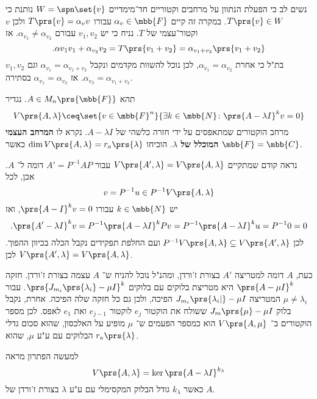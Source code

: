 \documentclass[article, 10pt,oneside]{article}
\renewcommand{\emph}[1]{\textbf{#1}}
\begin{document}
\begin{solution}
נשים לב כי הפעלת הנתוון על מרחבים וקטוריים חד־מימדיים
$W = \spn\set{v}$
נותנת כי
$T\prs{v} \in W$.
במקרה זה קיים
$\alpha_v \in \mbb{F}$
עבורו
$T\prs{v} = \alpha_v v$
ולכן
$v$
וקטור־עצמי של
$T$.
נניח כי יש
$v_1, v_2$
עבורם
$\alpha_{v_1} \neq \alpha_{v_2}$.
אז
\[\text{.} \alpha{v_1} v_1 + \alpha_{v_2} v_2 = T\prs{v_1 + v_2} = \alpha_{v_1 + v_2} \prs{v_1 + v_2}\]
$v_1,v_2$
בת"ל כי אחרת
$\alpha_{v_1} = \alpha_{v_2}$,
לכן נוכל להשוות מקדמים ונקבל
$\alpha_{v_1} = \alpha_{v_1 + v_2}$
וגם
$\alpha_{v_2} = \alpha_{v_1 + v_2}$.
אז
$\alpha_{v_1} = \alpha_{v_2}$
בסתירה.
\end{solution}

\begin{exercise}
תהא
$A \in M_n\prs{\mbb{F}}$.
נגדיר
\[V\prs{A, \lambda} \ceq \set{v \in \mbb{F}^n}{\exists k \in \mbb{N} \colon \prs{A- \lambda I}^k v = 0}\]
מרחב הוקטורים שמתאפסים על ידי חזרה כלשהי של
$A - \lambda I$.
נקרא לו
\emph{המרחב העצמי המוכלל של
$\lambda$}.
הוכיחו
$\dim V\prs{A, \lambda} = r_a\prs{\lambda}$
כאשר
$\mbb{F} = \mbb{C}$.
\end{exercise}

\begin{solution}
נראה קודם שמתקיים
$V\prs{A', \lambda} = V\prs{A, \lambda}$
עבור
$A' = P^{-1} A P$
דומה ל־%
$A$.
אכן, לכל
\[v = P^{-1} u \in P^{-1} V\prs{A,\lambda}\]
יש
$k \in \mbb{N}$
עבורו
$\prs{A-I}^k v = 0$,
ואז
\[\text{.} \prs{A' - \lambda I}^k v = P^{-1} \prs{A - \lambda I}^k P v = P^{-1} \prs{A-\lambda I}^k u = P^{-1} 0 = 0\]
לכן
$P^{-1} V\prs{A,\lambda} \subseteq V\prs{A', \lambda}$
ועם החלפת תפקידים נקבל הכלה בכיוון ההפוך.
לכן
$V\prs{A', \lambda} = V\prs{A, \lambda}$.

כעת,
$A$
דומה למטריצה
$A'$
בצורת ז'ורדן, ומהנ"ל נוכל להניח ש־%
$A$
עצמה בצורת ז'ורדן.
חזקה
$\prs{A - \mu I}^k$
היא מטריצת בלוקים עם בלוקים
$\prs{J_{m_i}\prs{\lambda_i} - \mu I}^k$.
עבור
$\mu \neq \lambda_i$
המטריצה
$J_{m_i}\prs{\lambda_i|} - \mu I$
הפיכה, ולכן גם כל חזקה שלה הפיכה.
אחרת, נקבל בלוק
$J_m\prs{\mu} - \mu I$
ששולח את הוקטור
$e_j$
לוקטור
$e_{j-1}$
ואת
$e_1$
לאפס.
לכן מספר הוקטורים ב־%
$V\prs{A, \mu}$
הוא כמספר הפעמים ש־%
$\mu$
מופיע על האלכסון, שהוא סכום גדלי הבלוקים עם ע"ע
$\mu$,
שהוא
$r_a\prs{\lambda}$.
\end{solution}

\begin{remark}
למעשה הפתרון מראה
\[V\prs{A, \lambda} = \ker\prs{A - \lambda I}^{k_\lambda}\]
כאשר
$k_\lambda$
גודל הבלוק המקסימלי עם ע"ע
$\lambda$
בצורת ז'ורדן של
$A$.
\end{remark}
\end{document}
